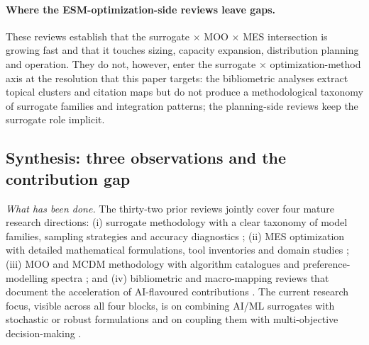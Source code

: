 \paragraph{Where the ESM-optimization-side reviews leave gaps.}
These reviews establish that the surrogate $\times$ MOO $\times$
MES intersection is growing fast and that it touches sizing,
capacity expansion, distribution planning and operation. They do
not, however, enter the surrogate $\times$ optimization-method
axis at the resolution that this paper targets: the bibliometric
analyses
\cite{arar_tahir_scientific_2023,batista_optimizing_2023,velasquez_intelligence_2023}
extract topical clusters and citation maps but do not produce a
methodological taxonomy of surrogate families and integration
patterns; the planning-side reviews
\cite{Zhou2024__2,vahidinasab_overview_2020,Conti2026} keep the
surrogate role implicit.

\subsection{Synthesis: three observations and the contribution gap}
\label{sec:related-synthesis}

\emph{What has been done.}
The thirty-two prior reviews jointly cover four mature research
directions: (i) surrogate methodology with a clear taxonomy of model
families, sampling strategies and accuracy diagnostics
\cite{Bhosekar2018,DiazManriquez2016,FernandezGodino2023,Westermann2019,Tan2026,Mohammadi2024,Starke2025214,Zhang2026_building};
(ii) MES optimization with detailed mathematical formulations,
tool inventories and domain studies
\cite{Manco2024,Klemm2021,Fattahi2020,agha_kassab_comprehensive_2024,nallolla_multi-objective_2023,malla_sg_optimization_2024,Li2025_hydrogen,Mylonopoulos202332697};
(iii) MOO and MCDM methodology with algorithm catalogues and
preference-modelling spectra
\cite{salgueiro_multi-objective_2019,ChenRenZhou2023,Sahoo2025,Etghani2025};
and (iv) bibliometric and macro-mapping reviews that document the
acceleration of AI-flavoured contributions
\cite{arar_tahir_scientific_2023,batista_optimizing_2023,velasquez_intelligence_2023}.
The current research focus, visible across all four blocks, is on
combining AI/ML surrogates with stochastic or robust formulations
\cite{Khaloie2025,Lim2025,Tan2026,Khan2024_DT,Li2025_hydrogen} and
on coupling them with multi-objective decision-making
\cite{DiazManriquez2016,Etghani2025,nallolla_multi-objective_2023,Sahoo2025,Elwy2024,Zhang2026_building}.

